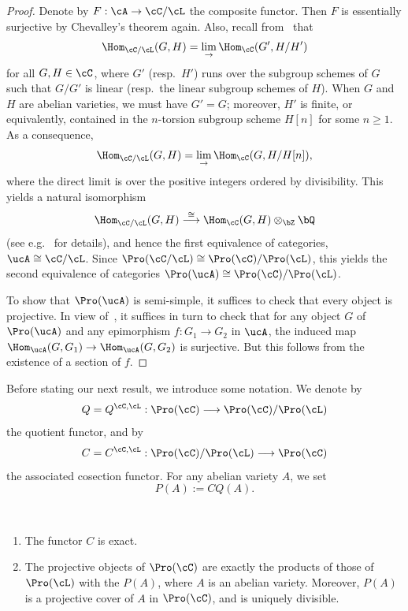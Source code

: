 \begin{proof}
Denote by $F : \cA \to \cC/\cL$ the composite functor. Then $F$ is essentially surjective by Chevalley's theorem again. Also, recall from~\cite[III.1]{Gabriel} that
\[
\Hom_{\cC/\cL}(G,H) = \lim_{\to} \Hom_{\cC}(G',H/H')
\]
for all $G,H \in \cC$, where $G'$ (resp.~$H'$) runs over the subgroup schemes of $G$ such that $G/G'$ is linear (resp.~the linear subgroup schemes of $H$). When $G$ and $H$ are abelian varieties, we must have $G' = G$; moreover, $H'$ is finite, or equivalently, contained in the $n$-torsion subgroup scheme $H[n]$ for some $n \geq 1$. As a consequence,
\[
\Hom_{\cC/\cL}(G,H) = \lim_{\to} \Hom_{\cC}(G,H/H[n]),
\]
where the direct limit is over the positive integers ordered by divisibility. This yields a natural isomorphism
\[
\Hom_{\cC/\cL}(G,H) \stackrel{\cong}{\longrightarrow}
\Hom_{\cC}(G,H) \otimes_{\bZ} \bQ
\]
(see e.g.~\cite[Prop.~3.6]{Br17a} for details), and hence the first equivalence of categories, $\ucA \cong \cC/\cL$. Since $\Pro(\cC/\cL) \cong \Pro(\cC)/\Pro(\cL)$, this yields the second equivalence of categories $\Pro(\ucA) \cong \Pro(\cC)/\Pro(\cL)$.

To show that $\Pro(\ucA)$ is semi-simple, it suffices to check that every object is projective. In view of~\cite[V.2.3.5]{DG}, it suffices in turn to check that for any object $G$ of $\Pro(\ucA)$ and any epimorphism $f: G_1 \to G_2$ in $\ucA$, the induced map $\Hom_{\ucA}(G,G_1) \to \Hom_{\ucA}(G,G_2)$ is surjective. But this follows from the existence of a section of $f$.
\end{proof}

Before stating our next result, we introduce some notation. We denote by
\[
Q = Q^{\cC,\cL} :
\Pro(\cC) \longrightarrow \Pro(\cC)/\Pro(\cL)
\]
the quotient functor, and by
\[
C = C^{\cC,\cL} :
\Pro(\cC)/\Pro(\cL) \longrightarrow \Pro(\cC)
\]
the associated cosection functor. For any abelian variety $A$, we set
\[
P(A) := CQ(A).
\]

\begin{prop}\label{prop:affine}\ 
\begin{enumerate}\romanenumi
\item \label{3.3.1} The functor $C$ is exact.
\item \label{3.3.2} The projective objects of $\Pro(\cC)$ are exactly the products of those of $\Pro(\cL)$ with the $P(A)$, where $A$ is an abelian variety. Moreover, $P(A)$ is a projective cover of $A$ in $\Pro(\cC)$, and is uniquely divisible.
\end{enumerate}
\end{prop}

